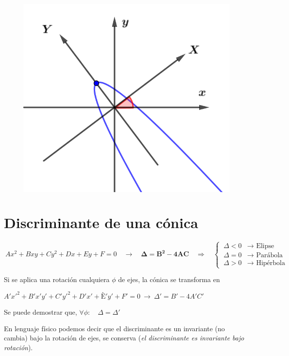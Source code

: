 \begin{figure}[H]
	\centering
	\includegraphics[width=.5\textwidth]{img-conicas/conicas54.png}
	\end{figure}


\vspace{15mm} 
\section{Discriminante de una cónica}
\vspace{1cm}


\begin{cuadro-naranja}
	$$\boxed{ \ Ax^2+Bxy+Cy^2+Dx+Ey+F=0 \quad \to \quad \boldsymbol{\Delta=B^2-4AC} \quad \Rightarrow \quad \begin{cases} \ \Delta <0 & \to \text{ Elipse} \\ \ \Delta=0 &\to \text{ Parábola} \\ \ \Delta>0 &\to \text{ Hipérbola} \end{cases} \ }$$
	\vspace{1mm}
\end{cuadro-naranja}

Si se aplica una rotación cualquiera $\phi$ de ejes, la cónica se transforma en 

$ A'x'^2+B'x'y'+C'y'^2+D'x'+È'y'+F'=0  \ \to \ \Delta'=B'-4A'C' $

Se puede demostrar que, $\forall \phi: \quad \Delta=\Delta'$

En lenguaje físico podemos decir que el discriminante es un invariante (no cambia) bajo la rotación de ejes, se conserva (\emph{el discriminante es invariante bajo rotación}).

